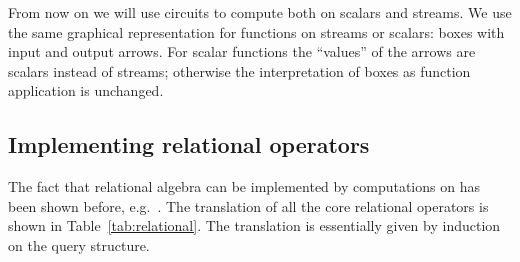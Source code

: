 From now on we will use circuits to compute both on scalars and streams.
We use the same graphical representation for functions on streams or scalars: 
boxes with input and output arrows.  For scalar functions the ``values'' 
of the arrows are scalars instead of streams; otherwise
the interpretation of boxes as function application is unchanged.

\subsection{Implementing relational operators}\label{sec:relational-operators}

The fact that relational algebra can be implemented by computations
on \zrs has been shown before, e.g.~\cite{green-pods07}.  The translation
of all the core relational operators is shown in Table~\ref{tab:relational}.  
The translation is essentially given 
by induction on the query structure.

